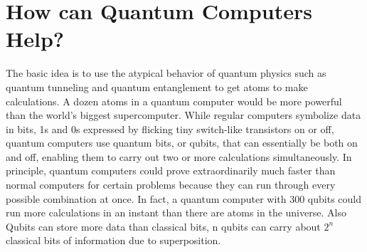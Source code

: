 \section{How can Quantum Computers Help?}
The basic idea is to use the atypical behavior of quantum physics such as quantum tunneling and quantum entanglement to get atoms to make calculations. A dozen atoms in a quantum computer would be more powerful than the world’s biggest supercomputer. While regular computers symbolize data in bits, 1s and 0s expressed by flicking tiny switch-like transistors on or off, quantum computers use quantum bits, or qubits, that can essentially be both on and off, enabling them to carry out two or more calculations simultaneously. In principle, quantum computers could prove extraordinarily much faster than normal computers for certain problems because they can run through every possible combination at once. In fact, a quantum computer with 300 qubits could run more calculations in an instant than there are atoms in the universe. Also Qubits can store more data than classical bits, n qubits can carry about $2^n$ classical bits of information due to superposition.
